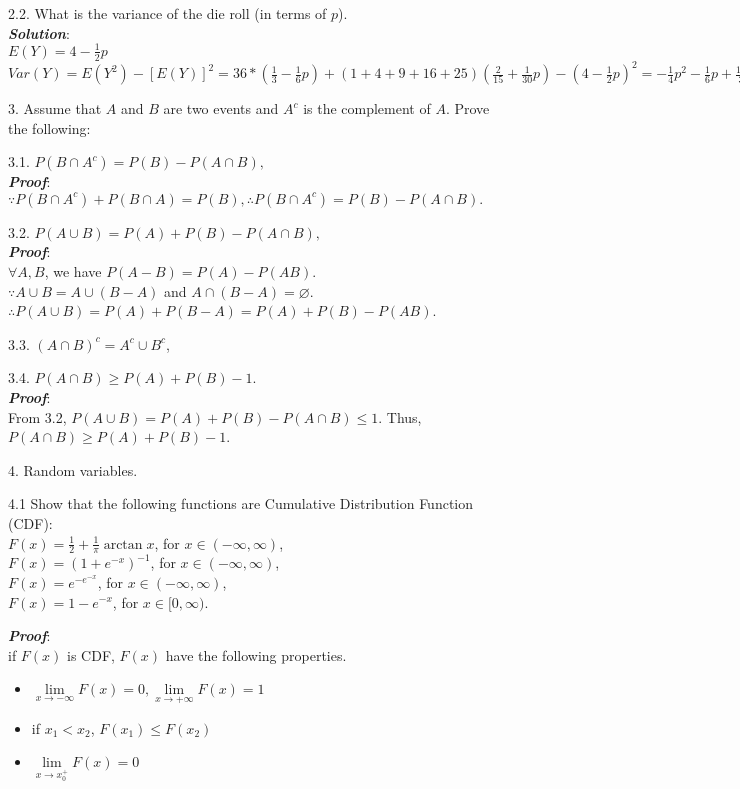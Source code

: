 \documentclass{article}
\theoremstyle{definition}
\theoremstyle{definition}
\theoremstyle{remark}
\begin{document}
2.2. What is the variance of the die roll (in terms of $p$).\\
\emph{\textbf{Solution}}:\\
$E(Y) = 4-\frac{1}{2}p$\\
$Var(Y) = E(Y^2)-[E(Y)]^2 = 36*(\frac{1}{3}-\frac{1}{6}p)+(1+4+9+16+25)(\frac{2}{15}+\frac{1}{30}p)-(4-\frac{1}{2}p)^2
=-\frac{1}{4}p^2-\frac{1}{6}p+\frac{10}{3}$

3. Assume that $A$ and $B$ are two events and $A^c$ is the complement of $A$. Prove the following:

3.1. $P(B\cap A^c)=P(B)-P(A\cap B),$\\
\emph{\textbf{Proof}}:\\
$\because P(B\cap A^c)+P(B\cap A) = P(B), \therefore P(B\cap A^c)=P(B)-P(A\cap B).$

3.2. $P(A\cup B) = P(A)+P(B)-P(A\cap B),$\\
\emph{\textbf{Proof}}:\\
$\forall A, B$, we have $P(A-B) = P(A)-P(AB)$.\\
$\because A\cup B = A \cup (B-A)$ and $A\cap(B-A)=\varnothing$. \\
$\therefore P(A\cup B)=P(A)+P(B-A)=P(A)+P(B)-P(AB)$.

3.3. $(A\cap B)^c = A^c\cup B^c$,


3.4. $P(A\cap B)\geq P(A)+P(B)-1$.\\
\emph{\textbf{Proof}}:\\
From 3.2, $P(A\cup B) = P(A)+P(B)-P(A\cap B) \leq 1$. Thus, $P(A\cap B)\geq P(A)+P(B)-1$.

4. Random variables.

4.1 Show that the following functions are Cumulative Distribution Function (CDF):\\
$F(x)=\frac 1 2 + \frac 1 \pi \arctan x$, for $x\in(-\infty,\infty)$,\\
$F(x)=(1+e^{-x})^{-1}$, for $x\in(-\infty,\infty)$,\\
$F(x)=e^{-e^{-x}}$, for $x\in(-\infty,\infty)$,\\
$F(x)=1-e^{-x}$, for $x\in[0,\infty)$.

\emph{\textbf{Proof}}:\\
if $F(x)$ is CDF, $F(x)$ have the following properties.
\begin{itemize}
\item $\lim\limits_{x \to -\infty }{F(x)} = 0, \lim\limits_{x \to +\infty }{F(x)} = 1$
\item if $x_1<x_2$, $F(x_1)\leq F(x_2)$
\item $\lim\limits_{x \to x_0^+}{F(x)} = 0$
\end{itemize}
\end{document}
